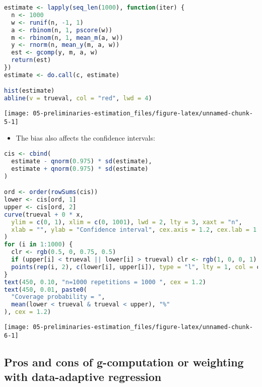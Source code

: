 \documentclass[
  12pt,
]{book}
\providecommand{\tightlist}{%
  \setlength{\itemsep}{0pt}\setlength{\parskip}{0pt}}
\theoremstyle{definition}
\theoremstyle{definition}
\theoremstyle{definition}
\newcommand{\1}{\mathbbm{1}}
\begin{document}
\begin{lstlisting}[language=R]
estimate <- lapply(seq_len(1000), function(iter) {
  n <- 1000
  w <- runif(n, -1, 1)
  a <- rbinom(n, 1, pscore(w))
  m <- rbinom(n, 1, mean_m(a, w))
  y <- rnorm(n, mean_y(m, a, w))
  est <- gcomp(y, m, a, w)
  return(est)
})
estimate <- do.call(c, estimate)

hist(estimate)
abline(v = trueval, col = "red", lwd = 4)
\end{lstlisting}

\begin{center}\texttt{[image: 05-preliminaries-estimation\_files/figure-latex/unnamed-chunk-5-1]} \end{center}

\begin{itemize}
\tightlist
\item
  The bias also affects the confidence intervals:
\end{itemize}

\begin{lstlisting}[language=R]
cis <- cbind(
  estimate - qnorm(0.975) * sd(estimate),
  estimate + qnorm(0.975) * sd(estimate)
)

ord <- order(rowSums(cis))
lower <- cis[ord, 1]
upper <- cis[ord, 2]
curve(trueval + 0 * x,
  ylim = c(0, 1), xlim = c(0, 1001), lwd = 2, lty = 3, xaxt = "n",
  xlab = "", ylab = "Confidence interval", cex.axis = 1.2, cex.lab = 1.2
)
for (i in 1:1000) {
  clr <- rgb(0.5, 0, 0.75, 0.5)
  if (upper[i] < trueval || lower[i] > trueval) clr <- rgb(1, 0, 0, 1)
  points(rep(i, 2), c(lower[i], upper[i]), type = "l", lty = 1, col = clr)
}
text(450, 0.10, "n=1000 repetitions = 1000 ", cex = 1.2)
text(450, 0.01, paste0(
  "Coverage probability = ",
  mean(lower < trueval & trueval < upper), "%"
), cex = 1.2)
\end{lstlisting}

\begin{center}\texttt{[image: 05-preliminaries-estimation\_files/figure-latex/unnamed-chunk-6-1]} \end{center}

\hypertarget{pros-and-cons-of-g-computation-or-weighting-with-data-adaptive-regression}{%
\subsection{Pros and cons of g-computation or weighting with data-adaptive regression}\label{pros-and-cons-of-g-computation-or-weighting-with-data-adaptive-regression}}
\end{document}
